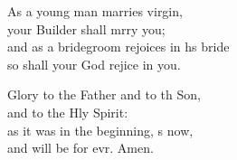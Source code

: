 \begin{psalmverse}
\begin{patverse}
As a young man marries  virgin,\Med\\
your Builder shall mrry you;\\
and as a bridegroom rejoices in h\pointup{\i}s bride\Med\\
so shall your God rejice in you.

Glory to the Father and to th Son,\Med\\
    and to the Hly Spirit:\\
as it was in the beginning, \pointup{\i}s now,\Med\\
    and will be for evr. Amen.
  \end{patverse}
\end{psalmverse}
